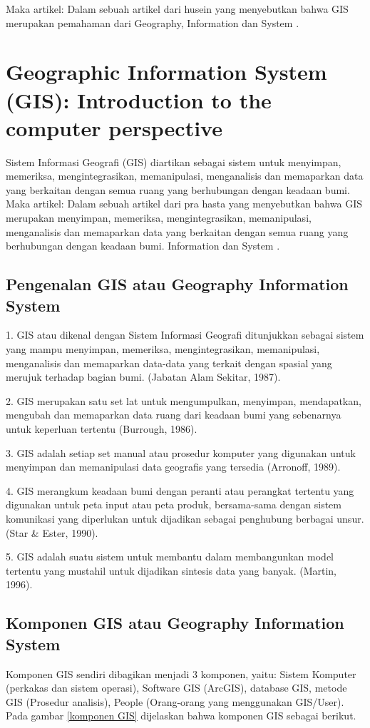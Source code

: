 Maka artikel:
	Dalam sebuah artikel dari husein yang menyebutkan bahwa  GIS merupakan pemahaman dari
	Geography, Information dan System \cite{husein2006konsep}.

\section{Geographic Information System (GIS): Introduction to the computer perspective}
Sistem Informasi Geografi (GIS) diartikan sebagai sistem untuk menyimpan, memeriksa, 
mengintegrasikan, memanipulasi, menganalisis dan memaparkan data yang berkaitan dengan semua 
ruang yang berhubungan dengan keadaan bumi.
Maka artikel:
	Dalam sebuah artikel dari pra hasta yang menyebutkan bahwa  GIS merupakan menyimpan, memeriksa, mengintegrasikan, memanipulasi, menganalisis dan memaparkan data yang berkaitan dengan semua ruang yang berhubungan dengan keadaan bumi. Information dan System \cite{prahasta2009sistem}.

\subsection{Pengenalan GIS atau Geography Information System}
1. GIS atau dikenal dengan Sistem Informasi Geografi ditunjukkan sebagai sistem yang mampu menyimpan, memeriksa, mengintegrasikan, memanipulasi, menganalisis dan memaparkan data-data yang terkait dengan spasial yang merujuk terhadap bagian bumi. (Jabatan Alam Sekitar, 1987).

2. GIS merupakan satu set lat untuk mengumpulkan, menyimpan, mendapatkan, mengubah dan memaparkan data ruang dari keadaan bumi yang sebenarnya untuk keperluan tertentu (Burrough, 1986).

3. GIS adalah setiap set manual atau prosedur komputer yang digunakan untuk menyimpan dan memanipulasi data geografis yang tersedia (Arronoff, 1989).

4. GIS merangkum keadaan bumi dengan peranti atau perangkat tertentu yang digunakan untuk peta input atau peta produk, bersama-sama dengan sistem komunikasi yang diperlukan untuk dijadikan sebagai penghubung berbagai unsur. (Star \& Ester, 1990).

5. GIS adalah suatu sistem untuk membantu dalam membangunkan model tertentu yang mustahil untuk dijadikan sintesis data yang banyak. (Martin, 1996).

\subsection{Komponen GIS atau Geography Information System}
Komponen GIS sendiri dibagikan menjadi 3 komponen, yaitu:
Sistem Komputer (perkakas dan sistem operasi), Software GIS
(ArcGIS), database GIS, metode GIS (Prosedur analisis), People (Orang-orang yang menggunakan GIS/User).
Pada gambar \ref{komponen GIS} dijelaskan bahwa komponen GIS sebagai berikut.

